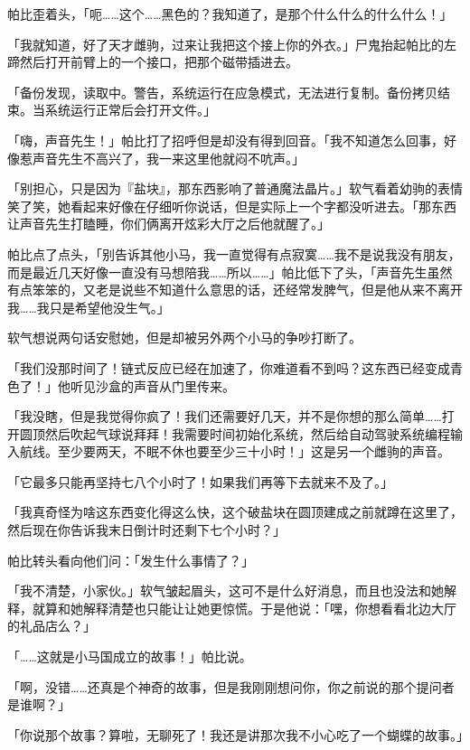 帕比歪着头，「呃……这个……黑色的？我知道了，是那个什么什么的什么什么！」

「我就知道，好了天才雌驹，过来让我把这个接上你的外衣。」尸鬼抬起帕比的左蹄然后打开前臂上的一个接口，把那个磁带插进去。

「{\mt 备份发现，读取中。警告，系统运行在应急模式，无法进行复制。备份拷贝结束。当系统运行正常后会打开文件。}」

「嗨，声音先生！」帕比打了招呼但是却没有得到回音。「我不知道怎么回事，好像惹声音先生不高兴了，我一来这里他就闷不吭声。」

「别担心，只是因为『盐块』，那东西影响了普通魔法晶片。」软气看着幼驹的表情笑了笑，她看起来好像在仔细听你说话，但是实际上一个字都没听进去。「那东西让声音先生打瞌睡，你们俩离开炫彩大厅之后他就醒了。」

帕比点了点头，「别告诉其他小马，我一直觉得有点寂寞……我不是说我没有朋友，而是最近几天好像一直没有马想陪我……所以……」帕比低下了头，「声音先生虽然有点笨笨的，又老是说些不知道什么意思的话，还经常发脾气，但是他从来不离开我……我只是希望他没生气。」

软气想说两句话安慰她，但是却被另外两个小马的争吵打断了。

「我们没那时间了！链式反应已经在加速了，你难道看不到吗？这东西已经变成青色了！」他听见沙盒的声音从门里传来。

「我没瞎，但是我觉得你疯了！我们还需要好几天，并不是你想的那么简单……打开圆顶然后吹起气球说拜拜！我需要时间初始化系统，然后给自动驾驶系统编程输入航线。至少要两天，不眠不休也要至少三十小时！」这是另一个雌驹的声音。

「它最多只能再坚持七八个小时了！如果我们再等下去就来不及了。」

「我真奇怪为啥这东西变化得这么快，这个破盐块在圆顶建成之前就蹲在这里了，然后现在你告诉我末日倒计时还剩下七个小时？」

帕比转头看向他们问：「发生什么事情了？」

「我不清楚，小家伙。」软气皱起眉头，这可不是什么好消息，而且也没法和她解释，就算和她解释清楚也只能让让她更惊慌。于是他说：「嘿，你想看看北边大厅的礼品店么？」

\horizonline


「……这就是小马国成立的故事！」帕比说。

「啊，没错……还真是个神奇的故事，但是我刚刚想问你，你之前说的那个提问者是谁啊？」

「你说那个故事？算啦，无聊死了！我还是讲那次我不小心吃了一个蝴蝶的故事。」

